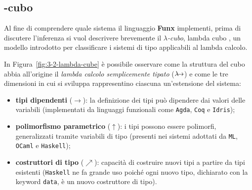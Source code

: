 \subsection{\texorpdfstring{\textlambda}{lambda}-cubo}
\label{sec:3-2-lambda-cube}

Al fine di comprendere quale sistema il linguaggio \textbf{Funx} implementi,
prima di discutere l'inferenza si vuol descrivere brevemente il \textit{$\lambda$-cubo}, lambda cubo \cite{Barendregt-1991-GeneralizedSystems},
un modello introdotto per classificare i sistemi di tipo applicabili al lambda calcolo.

\noindent In Figura~\ref{fig:3-2-lambda-cube} è possibile osservare come la struttura del cubo abbia all'origine
il \textit{lambda calcolo semplicemente tipato} ($\lambda\mkern-9mu\rightarrow$) e come le tre dimensioni
in cui si sviluppa rappresentino ciascuna un'estensione del sistema:
\begin{itemize}
    \item \textbf{tipi dipendenti} ($\rightarrow$): la definizione dei tipi può dipendere dai valori delle variabili
          (implementati da linguaggi funzionali come \texttt{Agda}, \texttt{Coq} e \texttt{Idris});
    \item \textbf{polimorfismo parametrico} ($\uparrow$): i tipi possono essere polimorfi, generalizzati
          tramite variabili di tipo (presenti nei sistemi adottati da \texttt{ML}, \texttt{OCaml} e \texttt{Haskell});
    \item \textbf{costruttori di tipo} ($\nearrow$): capacità di costruire nuovi tipi a partire da tipi esistenti
          (\texttt{Haskell} ne fa grande uso poiché ogni nuovo tipo,
          dichiarato con la keyword \texttt{data}, è un nuovo costruttore di tipo).
\end{itemize}

